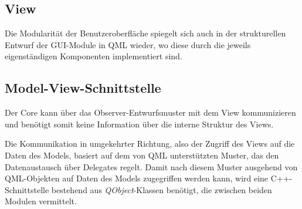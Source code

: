 \subsection{View}

Die Modularität der Benutzeroberfläche spiegelt sich auch in der strukturellen Entwurf der GUI-Module in QML wieder, wo diese durch die jeweils eigenständigen Komponenten implementiert sind.

\subsection{Model-View-Schnittstelle}

Der Core kann über das Observer-Entwurfsmuster mit dem View kommunizieren und benötigt somit keine Information über die interne Struktur des Views.

Die Kommunikation in umgekehrter Richtung, also der Zugriff des Views auf die Daten des Models, basiert auf dem von QML unterstützten Muster, das den Datenaustausch über Delegates regelt. Damit nach diesem Muster ausgehend von QML-Objekten auf Daten des Models zugegriffen werden kann, wird eine C++-Schnittstelle bestehend aus \textit{QObject}-Klassen benötigt, die zwischen beiden Modulen vermittelt.
